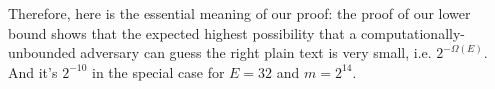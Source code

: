 \documentclass[10pt, conference, compsocconf]{IEEEtran}
\begin{document}
    Therefore, here is the essential meaning of our proof:
    the proof of our lower bound shows that
    the expected highest possibility that a computationally-unbounded
    adversary can guess the right plain text is very small, i.e. $2^{-\Omega(E)}$.
    And it's $2^{-10}$ in the special case for $E = 32$ and $m = 2^{14}$.
%
%

%
%

\end{document}
